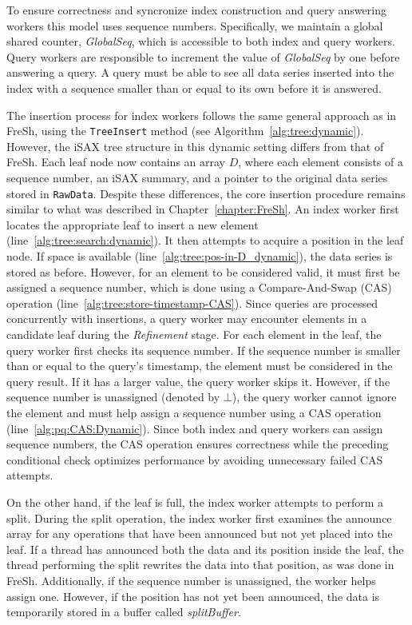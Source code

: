 \documentclass[a4paper,11pt,twoside,openany]{book}
\begin{document}
To ensure correctness and syncronize index construction and query answering workers
this model uses sequence numbers. 
Specifically, we maintain a global shared counter, \textit{GlobalSeq}, which is accessible to both
index and query workers. Query workers are responsible to increment the value of \textit{GlobalSeq} 
by one before answering a query. A query must be able to see all data series inserted
into the index with a sequence smaller than or equal to its own before it is answered.  

The insertion process for index workers follows the same general approach as in FreSh,
using the \texttt{TreeInsert} method (see Algorithm~\ref{alg:tree:dynamic}). However,
the iSAX tree structure in this dynamic setting differs from that of FreSh.
Each leaf node now contains an array \( D \), where each element consists of
a sequence number, an iSAX summary, and a pointer to the original data series stored in
\texttt{RawData}. Despite these differences, the core insertion procedure remains
similar to what was described in Chapter~\ref{chapter:FreSh}.  
An index worker first locates the appropriate leaf to insert a new element
(line~\ref{alg:tree:search:dynamic}). It then attempts to acquire a position in the leaf
node. If space is available (line~\ref{alg:tree:pos-in-D_dynamic}), the data series is
stored as before. However, for an element to be considered valid, it must first be assigned
a sequence number, which is done using a Compare-And-Swap (CAS) operation
(line~\ref{alg:tree:store-timestamp-CAS}).  
Since queries are processed concurrently with insertions, a query worker may
encounter elements in a candidate leaf during the \textit{Refinement} stage. For each
element in the leaf, the query worker first checks its sequence number. If the sequence
number is smaller than or equal to the query's timestamp, the element must be considered
in the query result. If it has a larger value, the query worker skips it. However, if the
sequence number is unassigned (denoted by \( \bot \)), the query worker cannot ignore
the element and must help assign a sequence number using a CAS operation
(line~\ref{alg:pq:CAS:Dynamic}). Since both index and query workers can assign sequence
numbers, the CAS operation ensures correctness while the preceding conditional
check optimizes performance by avoiding unnecessary failed CAS attempts.

On the other hand, if the leaf is full, the index worker attempts to perform a split.  
During the split operation, the index worker first examines the announce array
for any operations that have been announced but not yet placed into the leaf.
If a thread has announced both the data and its position inside the leaf,
the thread performing the split rewrites the data into that position,
as was done in FreSh. Additionally, if the sequence number is unassigned,
the worker helps assign one. However, if the position has not yet been announced,
the data is temporarily stored in a buffer called \textit{splitBuffer}.  
\end{document}
